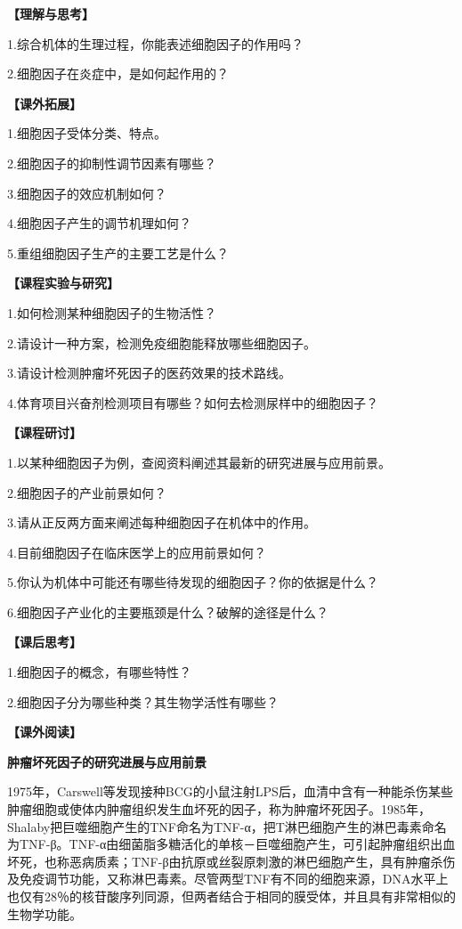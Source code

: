 \noindent\textbf{【理解与思考】}

1.综合机体的生理过程，你能表述细胞因子的作用吗？

2.细胞因子在炎症中，是如何起作用的？

\noindent\textbf{【课外拓展】}

1.细胞因子受体分类、特点。

2.细胞因子的抑制性调节因素有哪些？

3.细胞因子的效应机制如何？

4.细胞因子产生的调节机理如何？

5.重组细胞因子生产的主要工艺是什么？

\noindent\textbf{【课程实验与研究】}

1.如何检测某种细胞因子的生物活性？

2.请设计一种方案，检测免疫细胞能释放哪些细胞因子。

3.请设计检测肿瘤坏死因子的医药效果的技术路线。

4.体育项目兴奋剂检测项目有哪些？如何去检测尿样中的细胞因子？

\noindent\textbf{【课程研讨】}

1.以某种细胞因子为例，查阅资料阐述其最新的研究进展与应用前景。

2.细胞因子的产业前景如何？

3.请从正反两方面来阐述每种细胞因子在机体中的作用。

4.目前细胞因子在临床医学上的应用前景如何？

5.你认为机体中可能还有哪些待发现的细胞因子？你的依据是什么？

6.细胞因子产业化的主要瓶颈是什么？破解的途径是什么？

\noindent\textbf{【课后思考】}

1.细胞因子的概念，有哪些特性？

2.细胞因子分为哪些种类？其生物学活性有哪些？

\noindent\textbf{【课外阅读】}

\begin{center}
    \textbf{\Large 肿瘤坏死因子的研究进展与应用前景}
\end{center}

1975年，Carswell等发现接种BCG的小鼠注射LPS后，血清中含有一种能杀伤某些肿瘤细胞或使体内肿瘤组织发生血坏死的因子，称为肿瘤坏死因子。1985年，Shalaby把巨噬细胞产生的TNF命名为TNF-α，把T淋巴细胞产生的淋巴毒素命名为TNF-β。TNF-α由细菌脂多糖活化的单核－巨噬细胞产生，可引起肿瘤组织出血坏死，也称恶病质素；TNF-β由抗原或丝裂原刺激的淋巴细胞产生，具有肿瘤杀伤及免疫调节功能，又称淋巴毒素。尽管两型TNF有不同的细胞来源，DNA水平上也仅有28％的核苷酸序列同源，但两者结合于相同的膜受体，并且具有非常相似的生物学功能。

